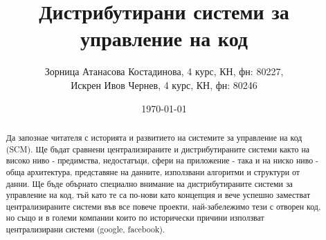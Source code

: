 \documentclass[a4paper]{article}
\begin{document}
\title{Дистрибутирани системи за управление на код}
\author{
Зорница Атанасова Костадинова, 4 курс, КН, фн: 80227, \\
Искрен Ивов Чернев, 4 курс, КН, фн: 80246
}
\date{\today}
\maketitle

\begin{abstract}
Да запознае читателя с историята и развитието на системите за управление на код (SCM). Ще бъдат сравнени централизираните и дистрибутираните системи както на високо ниво - предимства, недостатъци, сфери на приложение - така и на ниско ниво - обща архитектура, представяне на данните, използвани алгоритми и структури от данни. Ще бъде обърнато специално внимание на дистрибутираните системи за управление на код, тъй като те са по-нови като концепция и вече успешно заместват централизираните системи във все повече проекти, най-забележимо тези с отворен код, но също и в големи компании които по исторически причини използват централизирани системи (google, facebook).
\end{abstract}
\newpage

\setcounter{tocdepth}{2}
\tableofcontents
\newpage

% 
% 
% 
% 
% 
% 
% 
%
%
%
\end{document}
